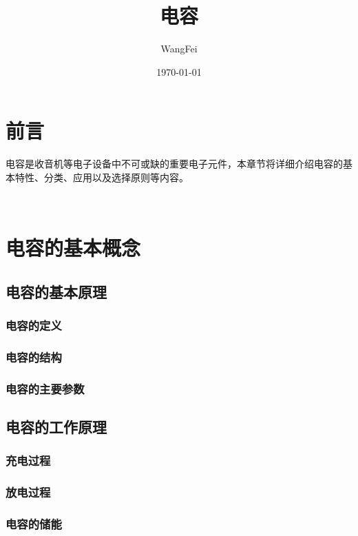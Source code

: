\documentclass[12pt,UTF8]{ctexbook}
\title{\heiti\zihao{0} 电容}
\author{WangFei}
\date{\today}
\begin{document}
\maketitle
\tableofcontents

\frontmatter
\chapter{前言}

电容是收音机等电子设备中不可或缺的重要电子元件，本章节将详细介绍电容的基本特性、分类、应用以及选择原则等内容。

\mainmatter

~\\

\chapter{电容的基本概念}

\section{电容的基本原理}

\subsection{电容的定义}

\subsection{电容的结构}

\subsection{电容的主要参数}

\section{电容的工作原理}

\subsection{充电过程}

\subsection{放电过程}

\subsection{电容的储能}
\end{document}
